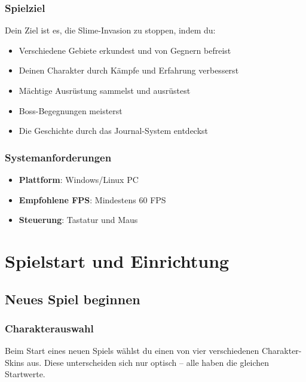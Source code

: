 \documentclass[
  a4paper,
  11pt,
  ngerman,
  parskip=half,
  bibliography=totoc,
  listof=totoc
]{scrreprt}
\begin{document}
\subsection{Spielziel}

Dein Ziel ist es, die Slime-Invasion zu stoppen, indem du:
\begin{itemize}
    \item Verschiedene Gebiete erkundest und von Gegnern befreist
    \item Deinen Charakter durch Kämpfe und Erfahrung verbesserst
    \item Mächtige Ausrüstung sammelst und ausrüstest
    \item Boss-Begegnungen meisterst
    \item Die Geschichte durch das Journal-System entdeckst
\end{itemize}

\subsection{Systemanforderungen}

\begin{itemize}
    \item \textbf{Plattform}: Windows/Linux PC
    \item \textbf{Empfohlene FPS}: Mindestens 60 \ac{FPS}
    \item \textbf{Steuerung}: Tastatur und Maus
\end{itemize}


\chapter{Spielstart und Einrichtung}

\section{Neues Spiel beginnen}

\subsection{Charakterauswahl}

Beim Start eines neuen Spiels wählst du einen von vier verschiedenen Charakter-Skins aus. Diese unterscheiden sich nur optisch -- alle haben die gleichen Startwerte.
\end{document}

